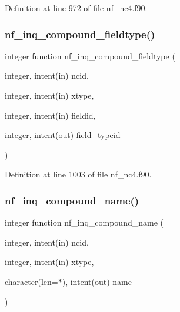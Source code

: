 Definition at line 972 of file nf\+\_\+nc4.\+f90.

\mbox{\label{nf__nc4_8f90_aafecf41e81f700e9e77b7398d8e28919}} 
\subsubsection{\texorpdfstring{nf\+\_\+inq\+\_\+compound\+\_\+fieldtype()}{nf\_inq\_compound\_fieldtype()}}
{\footnotesize\ttfamily integer function nf\+\_\+inq\+\_\+compound\+\_\+fieldtype (\begin{DoxyParamCaption}\item[{integer, intent(in)}]{ncid,  }\item[{integer, intent(in)}]{xtype,  }\item[{integer, intent(in)}]{fieldid,  }\item[{integer, intent(out)}]{field\+\_\+typeid }\end{DoxyParamCaption})}



Definition at line 1003 of file nf\+\_\+nc4.\+f90.

\mbox{\label{nf__nc4_8f90_a65875c90d95fc58afba91e1e9ab2387a}} 
\subsubsection{\texorpdfstring{nf\+\_\+inq\+\_\+compound\+\_\+name()}{nf\_inq\_compound\_name()}}
{\footnotesize\ttfamily integer function nf\+\_\+inq\+\_\+compound\+\_\+name (\begin{DoxyParamCaption}\item[{integer, intent(in)}]{ncid,  }\item[{integer, intent(in)}]{xtype,  }\item[{character(len=$\ast$), intent(out)}]{name }\end{DoxyParamCaption})}



